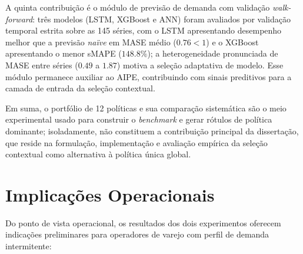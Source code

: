 A quinta contribuição é o módulo de previsão de demanda com validação \textit{walk-forward}: três modelos (LSTM, XGBoost e ANN) foram avaliados por validação temporal estrita sobre as 145 séries, com o LSTM apresentando desempenho melhor que a previsão \textit{naïve} em MASE médio ($0.76 < 1$) e o XGBoost apresentando o menor sMAPE ($148.8\%$); a heterogeneidade pronunciada de MASE entre séries ($0.49$ a $1.87$) motiva a seleção adaptativa de modelo. Esse módulo permanece auxiliar ao AIPE, contribuindo com sinais preditivos para a camada de entrada da seleção contextual.

Em suma, o portfólio de 12 políticas e sua comparação sistemática são o meio experimental usado para construir o \textit{benchmark} e gerar rótulos de política dominante; isoladamente, não constituem a contribuição principal da dissertação, que reside na formulação, implementação e avaliação empírica da seleção contextual como alternativa à política única global.

\section{Implicações Operacionais}

Do ponto de vista operacional, os resultados dos dois experimentos oferecem indicações preliminares para operadores de varejo com perfil de demanda intermitente:

